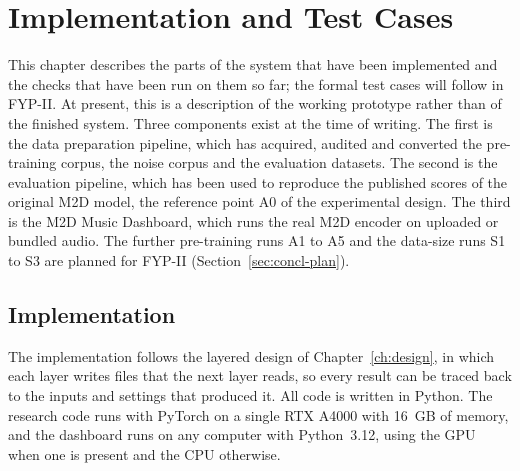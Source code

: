 \chapter{Implementation and Test Cases}
\label{ch:impl}
This chapter describes the parts of the system that have been implemented and the checks that have been run on them so far; the formal test cases will follow in FYP-II. At present, this is a description of the working prototype rather than of the finished system. Three components exist at the time of writing. The first is the data preparation pipeline, which has acquired, audited and converted the pre-training corpus, the noise corpus and the evaluation datasets. The second is the evaluation pipeline, which has been used to reproduce the published scores of the original M2D model, the reference point A0 of the experimental design. The third is the M2D Music Dashboard, which runs the real M2D encoder on uploaded or bundled audio. The further pre-training runs A1 to A5 and the data-size runs S1 to S3 are planned for FYP-II (Section~\ref{sec:concl-plan}).

\section{Implementation}
\label{sec:impl}
The implementation follows the layered design of Chapter~\ref{ch:design}, in which each layer writes files that the next layer reads, so every result can be traced back to the inputs and settings that produced it. All code is written in Python. The research code runs with PyTorch on a single RTX A4000 with 16~GB of memory, and the dashboard runs on any computer with Python~3.12, using the GPU when one is present and the CPU otherwise.

